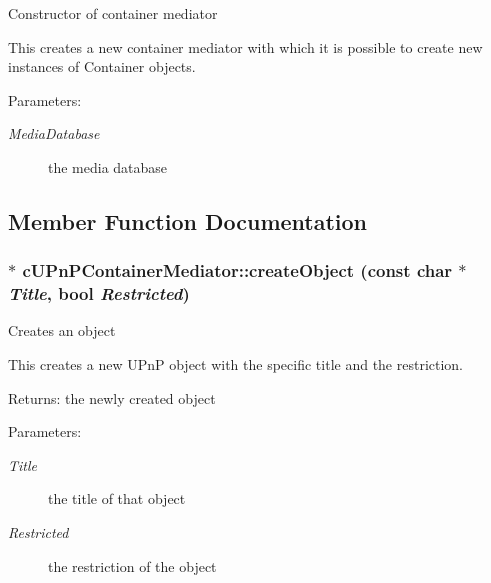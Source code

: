Constructor of container mediator

This creates a new container mediator with which it is possible to create new instances of Container objects.

\begin{Desc}
\item[Parameters:]
\begin{description}
\item[{\em MediaDatabase}]the media database \end{description}
\end{Desc}


\subsection{Member Function Documentation}
\hypertarget{classcUPnPContainerMediator_751177c725da94b1b91f6cda4645844d}{
\subsubsection[{createObject}]{ $\ast$ cUPnPContainerMediator::createObject (const char $\ast$ {\em Title}, \/  bool {\em Restricted})}}
\label{classcUPnPContainerMediator_751177c725da94b1b91f6cda4645844d}


Creates an object

This creates a new UPnP object with the specific title and the restriction.

\begin{Desc}
\item[Returns:]the newly created object \end{Desc}
\begin{Desc}
\item[Parameters:]
\begin{description}
\item[{\em Title}]the title of that object \item[{\em Restricted}]the restriction of the object \end{description}
\end{Desc}
 

